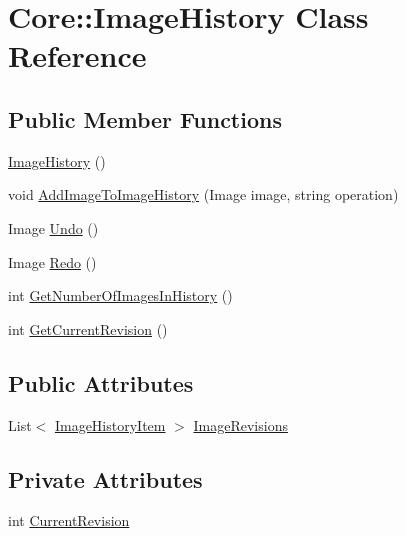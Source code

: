 \hypertarget{class_core_1_1_image_history}{
\section{Core::ImageHistory Class Reference}
\label{class_core_1_1_image_history}
}
\subsection*{Public Member Functions}
\begin{DoxyCompactItemize}
\item 
\hyperlink{class_core_1_1_image_history_afd0731bf62c251559970493943977486}{ImageHistory} ()
\item 
void \hyperlink{class_core_1_1_image_history_a6631d7fefea3a1a28fc6dcdf887daf37}{AddImageToImageHistory} (Image image, string operation)
\item 
Image \hyperlink{class_core_1_1_image_history_ade2a92df5f5525b0e3951b45b2f3434e}{Undo} ()
\item 
Image \hyperlink{class_core_1_1_image_history_afc601ae64181e745d9d94f4b16633a90}{Redo} ()
\item 
int \hyperlink{class_core_1_1_image_history_ae26bcfeed34a733dd372896a86bbc3d4}{GetNumberOfImagesInHistory} ()
\item 
int \hyperlink{class_core_1_1_image_history_a421e672ff9f20e10a03bf989cff4442e}{GetCurrentRevision} ()
\end{DoxyCompactItemize}
\subsection*{Public Attributes}
\begin{DoxyCompactItemize}
\item 
List$<$ \hyperlink{class_core_1_1_image_history_item}{ImageHistoryItem} $>$ \hyperlink{class_core_1_1_image_history_abb81d12e0bcf3f1f0e79c797f38cc6f2}{ImageRevisions}
\end{DoxyCompactItemize}
\subsection*{Private Attributes}
\begin{DoxyCompactItemize}
\item 
int \hyperlink{class_core_1_1_image_history_a1a695f64608fc10b95bce32634092f3c}{CurrentRevision}
\end{DoxyCompactItemize}



